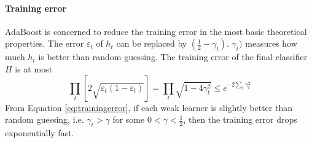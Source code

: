 \paragraph{Training error}
AdaBoost is concerned to reduce the training error in the most basic theoretical properties. The error $\varepsilon_{t}$ of $h_{t}$ can be replaced by $(\frac{1}{2}-\gamma_{t})$. $\gamma_{t})$ measures how much $h_{t}$ is better than random guessing. The training error of the final classifier $H$ is at most
\begin{equation} \label{eq:trainingerror}
 \prod_{t}[2\sqrt{\varepsilon_{t}(1- \varepsilon_{t})}] = \prod_{t}\sqrt{1-4\gamma_{t}^{2}}  \leq e^{-2\sum_{t}\gamma_{t}^{2}}
\end{equation}
From \mbox{Equation} \ref{eq:trainingerror}, if each weak learner is slightly better than random guessing, i.e. $\gamma_{t}>\gamma$ for some $0<\gamma<\frac{1}{2}$, then the training error drops exponentially fast.

